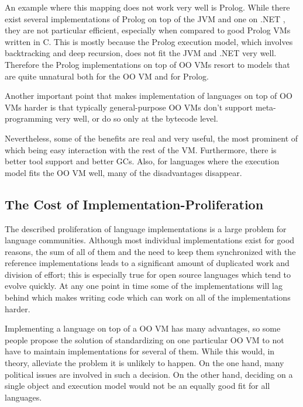 \documentclass{llncs}
\begin{document}
\begin{itemize}
An example where this mapping does not work very well is Prolog. While there
exist several implementations of Prolog on top of the JVM \cite{prologcafe}
\cite{InterProlog} and one on .NET \cite{psharp},
they are not particular efficient, especially when compared to good Prolog VMs
written in C. This is mostly because the Prolog execution model, which
involves backtracking and deep recursion, does not fit the JVM and .NET very
well. Therefore the Prolog implementations on top of OO VMs resort to models
that are quite unnatural both for the OO VM and for Prolog.

Another important point that makes implementation of languages on top of OO VMs
harder is that typically general-purpose OO VMs don't support meta-programming
very well, or do so only at the bytecode level.
\end{itemize}

Nevertheless, some of the benefits are real and very useful, the most
prominent of which being easy interaction with the rest of the VM. Furthermore, there
is better tool support and better GCs. Also, for languages where the execution
model fits the OO VM well, many of the disadvantages disappear.


\subsection{The Cost of Implementation-Proliferation}

The described proliferation of language implementations is a large problem for
language communities. Although most individual implementations exist for good
reasons, the sum of all of them and the need to keep them synchronized with the
reference implementations leads to a significant amount of duplicated work and division of
effort; this is especially true for open source languages which tend to evolve
quickly. At any one point in time some of the implementations will lag behind
which makes writing code which can work on all of the implementations harder.

Implementing a language on top of a OO VM has many advantages, so some
people propose the solution of standardizing on one particular OO VM to not have
to maintain implementations for several of them. While this would, in theory,
alleviate the problem it is unlikely to happen. On the one hand, many political
issues are involved in such a decision. On the other hand, deciding on a single
object and execution model would not be an equally good fit for all languages.
\end{document}
